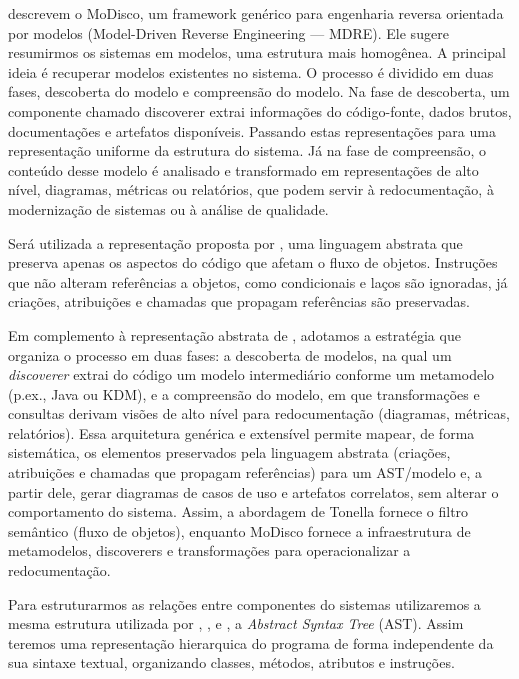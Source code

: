 \documentclass[12pt,a4paper]{article}
\begin{document}
\textcite{Bruneliere2010MoDisco} descrevem o MoDisco, um framework genérico para engenharia reversa orientada por modelos (Model-Driven Reverse Engineering — MDRE). Ele sugere resumirmos os sistemas em modelos, uma estrutura mais homogênea. A principal ideia é recuperar modelos existentes no sistema. O processo é dividido em duas fases, descoberta do modelo e compreensão do modelo. Na fase de descoberta, um componente chamado discoverer extrai informações do código-fonte, dados brutos, documentações e artefatos disponíveis. Passando estas representações para uma representação uniforme da estrutura do sistema. Já na fase de compreensão, o conteúdo desse modelo é analisado e transformado em representações de alto nível, diagramas, métricas ou relatórios, que podem servir à redocumentação, à modernização de sistemas ou à análise de qualidade.

Será utilizada a representação proposta por \textcite{tonella2007reverse}, uma linguagem abstrata que preserva apenas os aspectos do código que afetam o fluxo de objetos. Instruções que não alteram referências a objetos, como condicionais e laços são ignoradas, já criações, atribuições e chamadas que propagam referências são preservadas. 

Em complemento à representação abstrata de \textcite{tonella2007reverse}, adotamos a estratégia \textcite{Bruneliere2010MoDisco} que organiza o processo em duas fases: a descoberta de modelos, na qual um \textit{discoverer} extrai do código um modelo intermediário conforme um metamodelo (p.ex., Java ou KDM), e a compreensão do modelo, em que transformações e consultas derivam visões de alto nível para redocumentação (diagramas, métricas, relatórios). Essa arquitetura genérica e extensível permite mapear, de forma sistemática, os elementos preservados pela linguagem abstrata (criações, atribuições e chamadas que propagam referências) para um AST/modelo e, a partir dele, gerar diagramas de casos de uso e artefatos correlatos, sem alterar o comportamento do sistema. Assim, a abordagem de Tonella fornece o filtro semântico (fluxo de objetos), enquanto MoDisco fornece a infraestrutura de metamodelos, discoverers e transformações para operacionalizar a redocumentação.

Para estruturarmos as relações entre componentes do sistemas utilizaremos a mesma estrutura utilizada por \textcite{tonella2007reverse}, \textcite{pereira2011recovering}, \textcite{Wang2006AST} e \textcite{Fauzi2016AST}, a \textit{Abstract Syntax Tree} (AST). Assim teremos uma representação hierarquica do programa de forma independente da sua sintaxe textual, organizando classes, métodos, atributos e instruções.
\end{document}
